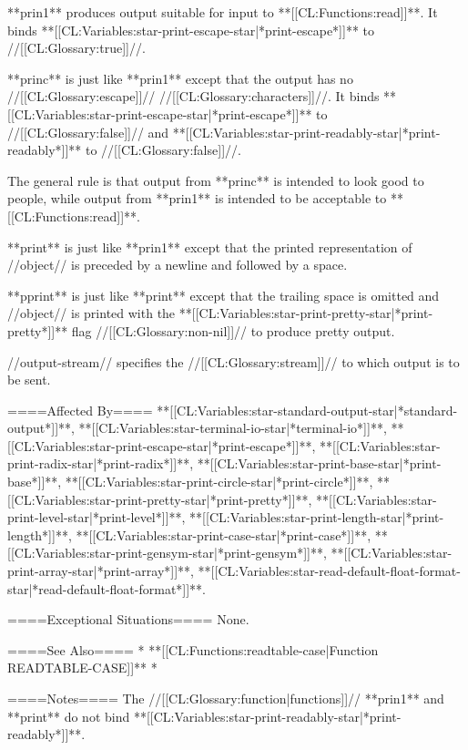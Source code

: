 **prin1** produces output suitable for input to **[[CL:Functions:read]]**. It binds **[[CL:Variables:star-print-escape-star|*print-escape*]]** to //[[CL:Glossary:true]]//.

**princ** is just like **prin1** except that the output has no //[[CL:Glossary:escape]]// //[[CL:Glossary:characters]]//. It binds **[[CL:Variables:star-print-escape-star|*print-escape*]]** to //[[CL:Glossary:false]]// and **[[CL:Variables:star-print-readably-star|*print-readably*]]** to //[[CL:Glossary:false]]//.

The general rule is that output from **princ** is intended to look good to people, while output from **prin1** is intended to be acceptable to **[[CL:Functions:read]]**.

**print** is just like **prin1** except that the printed representation of //object// is preceded by a newline and followed by a space.

**pprint** is just like **print** except that the trailing space is omitted and //object// is printed with the **[[CL:Variables:star-print-pretty-star|*print-pretty*]]** flag //[[CL:Glossary:non-nil]]// to produce pretty output.

//output-stream// specifies the //[[CL:Glossary:stream]]// to which output is to be sent.

====Affected By====
**[[CL:Variables:star-standard-output-star|*standard-output*]]**, **[[CL:Variables:star-terminal-io-star|*terminal-io*]]**, **[[CL:Variables:star-print-escape-star|*print-escape*]]**, **[[CL:Variables:star-print-radix-star|*print-radix*]]**, **[[CL:Variables:star-print-base-star|*print-base*]]**, **[[CL:Variables:star-print-circle-star|*print-circle*]]**, **[[CL:Variables:star-print-pretty-star|*print-pretty*]]**, **[[CL:Variables:star-print-level-star|*print-level*]]**, **[[CL:Variables:star-print-length-star|*print-length*]]**, **[[CL:Variables:star-print-case-star|*print-case*]]**, **[[CL:Variables:star-print-gensym-star|*print-gensym*]]**, **[[CL:Variables:star-print-array-star|*print-array*]]**, **[[CL:Variables:star-read-default-float-format-star|*read-default-float-format*]]**.

====Exceptional Situations====
None.

====See Also====
  * **[[CL:Functions:readtable-case|Function READTABLE-CASE]]**
  * {\secref\FORMATPrinterOps}

====Notes====
The //[[CL:Glossary:function|functions]]// **prin1** and **print** do not bind **[[CL:Variables:star-print-readably-star|*print-readably*]]**.

